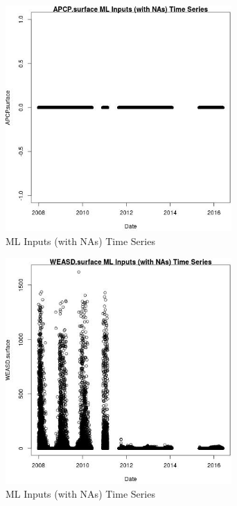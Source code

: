 \begin{figure} 
\centering  
\includegraphics[width=0.77\textwidth]{Code_Outputs/Report_ML_input_PM25_Step4_part_e_de_duplicated_aveswNAs_APCPsurfacevDate.jpg} 
\caption{\label{fig:Report_ML_input_PM25_Step4_part_e_de_duplicated_aveswNAsAPCPsurfacevDate}ML Inputs (with NAs) Time Series} 
\end{figure} 
 

\begin{figure} 
\centering  
\includegraphics[width=0.77\textwidth]{Code_Outputs/Report_ML_input_PM25_Step4_part_e_de_duplicated_aveswNAs_WEASDsurfacevDate.jpg} 
\caption{\label{fig:Report_ML_input_PM25_Step4_part_e_de_duplicated_aveswNAsWEASDsurfacevDate}ML Inputs (with NAs) Time Series} 
\end{figure} 
 

